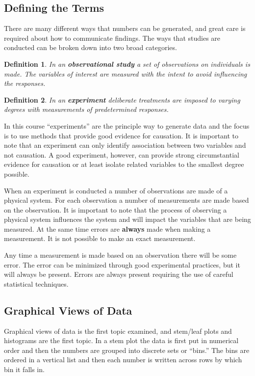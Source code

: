 \documentclass[12pt]{article}
\newtheorem{definition}{Definition}[section]
\begin{document}
\subsection{Defining the Terms}

There are many different ways that numbers can be generated, and great
care is required about how to communicate findings. The ways that
studies are conducted can be broken down into two broad categories.

\begin{definition}
  In an \textbf{observational study} a set of observations on
  individuals is made. The variables of interest are measured with the
  intent to avoid influencing the responses.
\end{definition}

\begin{definition}
  In an \textbf{experiment} deliberate treatments are imposed to
  varying degrees with measurements of predetermined responses.
\end{definition}

In this course ``experiments'' are the principle way to generate data
and the focus is to use methods that provide good evidence for
causation. It is important to note that an experiment can only
identify association between two variables and not causation.  A good
experiment, however, can provide strong circumstantial evidence for
causation or at least isolate related variables to the smallest degree
possible.

When an experiment is conducted a number of observations are made of a
physical system. For each observation a number of measurements are
made based on the observation. It is important to note that the
process of observing a physical system influences the system and will
impact the variables that are being measured. At the same time errors
are \textbf{always} made when making a measurement. It is not possible
to make an exact measurement. 

Any time a measurement is made based on an observation there will be
some error. The error can be minimized through good experimental
practices, but it will always be present. Errors are always present
requiring the use of careful statistical techniques.

\subsection{Graphical Views of Data}

Graphical views of data is the first topic examined, and stem/leaf
plots and histograms are the first topic. In a stem plot the data is
first put in numerical order and then the numbers are grouped into
discrete sets or ``bins.'' The bins are ordered in a vertical list and
then each number is written across rows by which bin it falls in.
\end{document}
